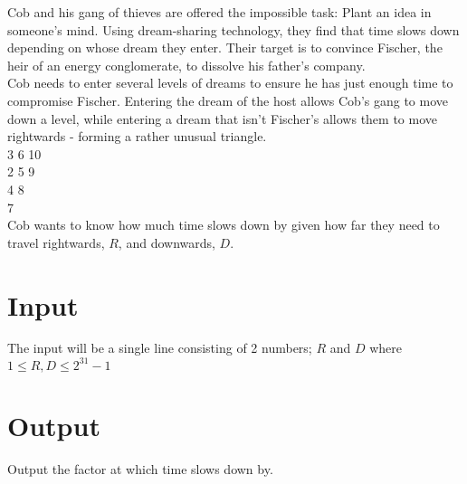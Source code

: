 
\noindent Cob and his gang of thieves are offered the impossible task: Plant an idea in someone's mind. Using dream-sharing technology, they find that time slows down depending on whose dream they enter. Their target is to convince Fischer, the heir of an energy conglomerate, to dissolve his father's company. \\

\noindent Cob needs to enter several levels of dreams to ensure he has just enough time to compromise Fischer. Entering the dream of the host allows Cob's gang to move down a level, while entering a dream that isn't Fischer's allows them to move rightwards - forming a rather unusual triangle. \\

 3 6 10\\
 2 5 9\\
 4 8\\
 7\\

\noindent Cob wants to know how much time slows down by given how far they need to travel rightwards, $R$, and downwards, $D$. \\

\section*{Input}
The input will be a single line consisting of 2 numbers; $R$ and $D$ where $1 \leq R, D \leq 2^{31} - 1$

\section*{Output}
Output the factor at which time slows down by.
